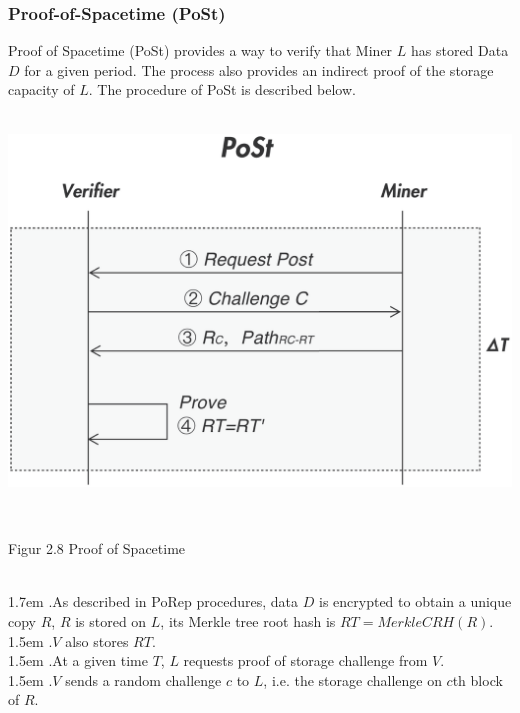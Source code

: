 \documentclass[10pt,a4paper]{article}
\begin{document}
        \subsubsection{Proof-of-Spacetime (PoSt)}  %
Proof of Spacetime (PoSt) provides a way to verify that Miner $L$ has stored Data $D$ for a given period. The process also provides an indirect proof of the storage capacity of $L$. The procedure of PoSt is described below.
\vspace{-0.5em}
\\ \\
\centerline{\includegraphics[width=380pt]{fig8}}
 \\\centerline{{Figur 2.8 Proof of Spacetime}}
 \vspace{-1.5em}
\\

\hangindent 1.7em
.\quad As described in PoRep procedures, data $D$ is encrypted to obtain a unique copy $R$, $R$ is stored on $L$, its Merkle tree root hash is $RT=MerkleCRH(R)$.
\vspace{-0.8em}
\\

\hangindent 1.5em
.\quad $V$ also stores $RT$.
\vspace{-0.8em}
\\

\hangindent 1.5em
.\quad At a given time $T$, $L$ requests proof of storage challenge from $V$.
\vspace{-0.8em}
\\

\hangindent 1.5em
.\quad $V$ sends a random challenge $c$ to $L$, i.e. the storage challenge on $c$th block of $R$.
\vspace{-0.8em}
\\
\end{document}
